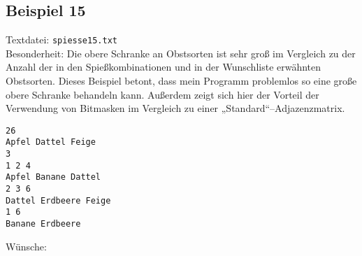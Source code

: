 \subsection{Beispiel 15}\label{example:15}
Textdatei: \texttt{spiesse15.txt}\\
Besonderheit: Die obere Schranke an Obstsorten ist sehr groß im Vergleich zu der Anzahl der 
in den Spießkombinationen und in der Wunschliste erwähnten Obstsorten. Dieses Beispiel betont, dass
mein Programm problemlos so eine große obere Schranke behandeln kann. Außerdem zeigt sich hier der
Vorteil der Verwendung von Bitmasken im Vergleich zu einer „Standard“--Adjazenzmatrix.
\begin{verbatim}
26
Apfel Dattel Feige
3
1 2 4
Apfel Banane Dattel
2 3 6
Dattel Erdbeere Feige
1 6
Banane Erdbeere
\end{verbatim}

\noindent
Wünsche: \\

\noindent
{}